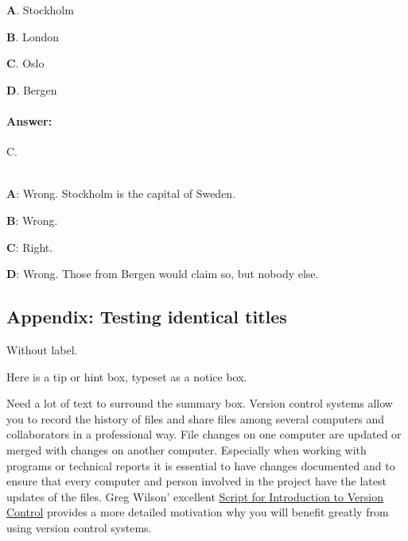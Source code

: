 \documentclass[%
oneside,                 %
final,                   %
10pt]{article}
\newenvironment{doconcequiz}{}{}
\newenvironment{notice_mdfboxadmon}[1][]{
\begin{notice_mdfboxmdframed}[frametitle=#1]
}
{
\end{notice_mdfboxmdframed}
}
\theoremstyle{definition}
\begin{document}
\begin{enumerate}
\begin{doconcequiz}
\textbf{A}. 
Stockholm

\textbf{B}. 
London

\textbf{C}. 
Oslo

\textbf{D}. 
Bergen


\paragraph{Answer:} C.

\\


\textbf{A}: Wrong. Stockholm is the capital of Sweden.

\textbf{B}: Wrong. 

\textbf{C}: Right. 

\textbf{D}: Wrong. Those from Bergen would claim so, but nobody else.




\vspace{3mm}

\end{doconcequiz}



\subsection{Appendix: Testing identical titles}

Without label.


\begin{notice_mdfboxadmon}[Tip.]
Here is a tip or hint box, typeset as a notice box.
\end{notice_mdfboxadmon} %



\clearpage

Need a lot of text to surround the summary box.
Version control systems allow you to record the history of files
and share files among several computers and collaborators in a
professional way. File changes on one computer are updated or
merged with changes on another computer. Especially when working
with programs or technical reports it is essential
to have changes documented and to
ensure that every computer and person involved in the project
have the latest updates of the files.
Greg Wilson' excellent \href{{https://software-carpentry.org/2010/07/script-for-introduction-to-version-control/}}{Script for Introduction to Version Control} provides a more detailed motivation why you will benefit greatly
from using version control systems.



\end{enumerate}
\end{document}
